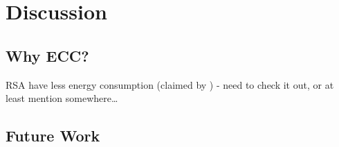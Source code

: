 \chapter{Discussion}
\acresetall


\section{Why ECC?}
RSA have less energy consumption (claimed by \cite{hosseinisecure}) - need to
check it out, or at least mention somewhere\ldots

\section{Future Work}
